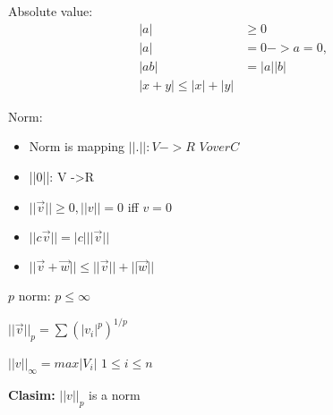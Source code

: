 \documentclass{article}
\begin{document}
Absolute value:
\begin{align*}
|a| &\geq 0 \\
|a| &=0 -> a=0,\\
|ab| & = |a||b|\\
|x+y| \leq |x|+|y|
\end{align*}

Norm:
\begin{itemize}
\item Norm is  mapping $||. || : V -> R$ $V over C$
\item ||0||: V ->R
\item $||\vec{v}|| \geq 0, ||v|| = 0$ iff $v=0$
\item $||c\vec{v}|| = |c|||\vec{v}||$
\item $||\vec{v}+\vec{w}|| \leq ||\vec{v}|| + ||\vec{w}||$
\end{itemize}

$p$ norm:
$p \leq \infty$

$||\vec{v}||_p = \sum (|v_i|^p)^{1/p}$

$||v||_{\infty} = max|V_i|$ $1 \leq i \leq n$ 


\textbf{Clasim:} $||v||_p$ is a norm
\end{document}
